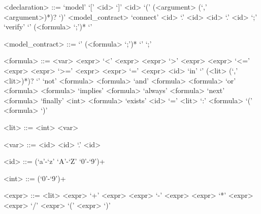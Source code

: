 \begin{grammar}
  <declaration> ::= `model' `[' <id> `]' <id> `(' (<argument> (`,' <argument>)*)? `)' <model\_contract>
  \alt `connect' <id> `.' <id> <id> `.' <id> `;'
  \alt `verify' `{' (<formula> `;')* `}'
  
  <model\_contract> ::= `{' (<formula> `;')* `}'
  \alt `;'
  
  <formula> ::= <var>
  \alt <expr> `<' <expr>
  \alt <expr> `>' <expr>
  \alt <expr> `<=' <expr>
  \alt <expr> `>=' <expr>
  \alt <expr> `=' <expr>
  \alt <id> `in' `{' (<lit> (`,' <lit>)*)? `}'
  \alt `not' <formula>
  \alt <formula> `and' <formula>
  \alt <formula> `or' <formula>
  \alt <formula> `implies' <formula>
  \alt `always' <formula>
  \alt `next' <formula>
  \alt `finally' <int> <formula>
  \alt `exists' <id> `=' <lit> `:' <formula>
  \alt `(' <formula> `)'
  
  <lit> ::= <int>
  \alt <var>
  
  <var> ::= <id>
  \alt <id> `.' <id>
  
  <id> ::= (`a'-`z' `A'-`Z' `0'-`9')+
  
  <int> ::= (`0'-`9')+
  
  <expr> ::= <lit>
  \alt <expr> `+' <expr>
  \alt <expr> `-' <expr>
  \alt <expr> `*' <expr>
  \alt <expr> `/' <expr>
  \alt `(' <expr> `)'
\end{grammar}
